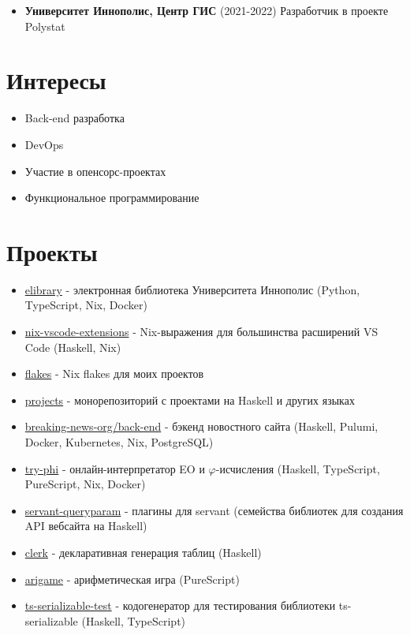 \documentclass[twocolumn,11pt]{report}
\begin{document}
\begin{itemize}
     \item \textbf{Университет Иннополис, Центр ГИС} (2021-2022) \newline
           Разработчик в проекте Polystat
\end{itemize}

\newpage

\section*{Интересы}
\begin{itemize}
     \itemsep0em
     \item Back-end разработка
     \item DevOps
     \item Участие в опенсорс-проектах
     \item Функциональное программирование
\end{itemize}

\section*{Проекты}
\begin{itemize}
     \itemsep0em
     \item \href{https://gitlab.pg.innopolis.university/elibrary/elibrary#electronic-library-of-iu}{elibrary} - электронная библиотека Университета Иннополис (Python, TypeScript, Nix, Docker)
     \item \href{https://github.com/nix-community/nix-vscode-extensions#readme}{nix-vscode-extensions} - Nix-выражения для большинства расширений VS Code (Haskell, Nix)
     \item \href{https://github.com/deemp/flakes#readme}{flakes} - Nix flakes для моих проектов
     \item \href{https://github.com/deemp/projects#readme}{projects} - монорепозиторий с проектами на Haskell и других языках
     \item \href{https://github.com/breaking-news-org/back-end#readme}{breaking-news-org/back-end} - бэкенд новостного сайта (Haskell, Pulumi, Docker, Kubernetes, Nix, PostgreSQL)
     \item \href{https://github.com/objectionary/try-phi#readme}{try-phi} - онлайн-интерпретатор EO и $\varphi$-исчисления (Haskell, TypeScript, PureScript, Nix, Docker)
     \item \href{https://github.com/deemp/servant-queryparam#readme}{servant-queryparam} - плагины для servant (семейства библиотек для создания API вебсайта на Haskell)
     \item \href{https://github.com/deemp/clerk#readme}{clerk} - декларативная генерация таблиц (Haskell)
     \item \href{https://github.com/deemp/arigame#readme}{arigame} - арифметическая игра (PureScript)
     \item \href{https://github.com/deemp/projects/tree/main/haskell/ts-serializable-test#readme}{ts-serializable-test} - кодогенератор для тестирования библиотеки ts-serializable (Haskell, TypeScript)
\end{itemize}
\end{document}

